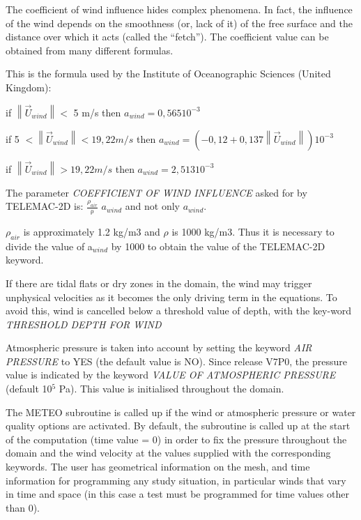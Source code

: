  The coefficient of wind influence hides complex phenomena. In fact, the influence of the wind depends on the smoothness (or, lack of it) of the free surface and the distance over which it acts (called the ``fetch''). The coefficient value can be obtained from many different formulas.

 This is the formula used by the Institute of Oceanographic Sciences (United Kingdom):



 if    $\left \|\vec{U}_{wind} \right \| <$ 5 m/s   then   $a_{wind}  = 0,565 10^{-3}$

 if  5   $< \left \| \vec{U}_{wind}  \right \| < 19,22 m/s$ then    $a_{wind} = (- 0,12 + 0,137 \left \| \vec{U}_{wind}   \right \|) 10^{-3}$

 if    $\left \| \vec{U}_{wind}  \right \|   > 19,22 m/s $  then     $a_{wind} = 2,513 10^{-3}$

 The parameter \textit{COEFFICIENT OF WIND INFLUENCE} asked for by TELEMAC-2D is: $\frac{{\rho }_{air}}{\mathrm{\rho }}$ $a_{wind}$ and not only $a_{wind}$.

 $\rho_{air}$ is approximately 1.2 kg/m3 and $\rho$ is 1000 kg/m3. Thus it is necessary to divide the value of a${}_{wind}$ by 1000 to obtain the value of the TELEMAC-2D keyword.

 If there are tidal flats or dry zones in the domain, the wind may trigger unphysical velocities as it becomes the only driving term in the equations. To avoid this, wind is cancelled below a threshold value of depth, with the key-word \textit{THRESHOLD DEPTH FOR WIND}

 Atmospheric pressure is taken into account by setting the keyword \textit{AIR PRESSURE} to YES (the default value is NO). Since release V7P0, the pressure value is indicated by the keyword \textit{VALUE OF ATMOSPHERIC PRESSURE} (default 10${}^{5}$ Pa). This value is initialised throughout the domain.

 The METEO subroutine is called up if the wind or atmospheric pressure or water quality options are activated. By default, the subroutine is called up at the start of the computation (time value = 0) in order to fix the pressure throughout the domain and the wind velocity at the values supplied with the corresponding keywords. The user has geometrical information on the mesh, and time information for programming any study situation, in particular winds that vary in time and space (in this case a test must be programmed for time values other than 0).


